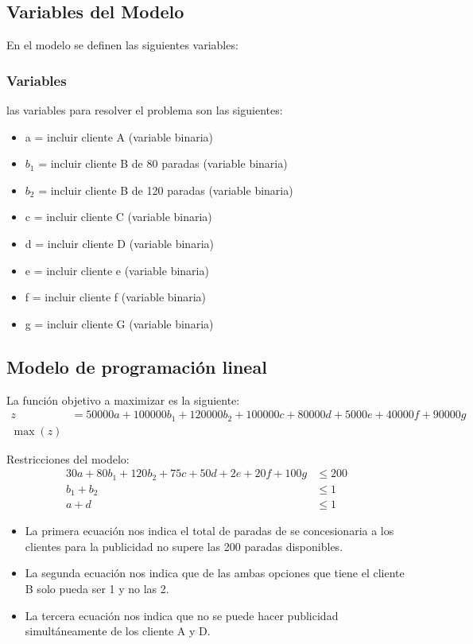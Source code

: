 \documentclass[a4paper, 12pt]{article}
\begin{document}
\subsection{Variables del Modelo}
En el modelo se definen las siguientes variables:
\subsubsection{Variables}
    las variables para resolver el problema son las siguientes:
\begin{itemize}
    \item a = incluir cliente A (variable binaria)
    \item $b_1$ = incluir cliente B de 80 paradas (variable binaria)
    \item $b_2$ = incluir cliente B de 120 paradas (variable binaria)
    \item c = incluir cliente C (variable binaria)
    \item d = incluir cliente D (variable binaria)
    \item e = incluir cliente e (variable binaria)
    \item f = incluir cliente f (variable binaria)
    \item g = incluir cliente G (variable binaria)
\end{itemize}

\subsection{Modelo de programación lineal}
    La función objetivo a maximizar es la siguiente:
\begin{align*}
    z &= 50000a + 100000b_1 + 120000b_2 + 100000c + 80000d + 5000e + 40000f + 90000g \\
    \max(z)
\end{align*}

Restricciones del modelo:
\begin{align*}
    30a + 80b_1 + 120b_2 + 75c + 50d + 2e + 20f + 100g &\leq 200 \\
    b_1 + b_2 &\leq 1 \\
    a + d &\leq 1
\end{align*}
\begin{itemize}
    \item La primera ecuación nos indica el total de paradas de se concesionaria a los clientes para la publicidad no supere las 200 paradas disponibles.
    \item La segunda ecuación nos indica que de las ambas opciones que tiene el cliente B solo pueda ser 1 y no las 2.
    \item La tercera ecuación nos indica que no se puede hacer publicidad simultáneamente de los cliente A y D.
    
\end{itemize}
\end{document}
